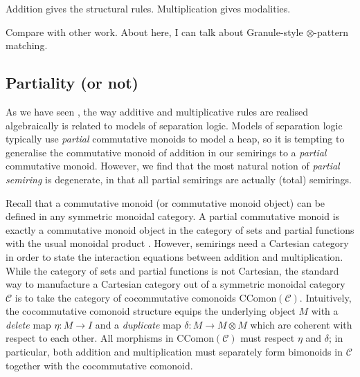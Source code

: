 Addition gives the structural rules.
Multiplication gives modalities.

Compare with other work.
About here, I can talk about Granule-style $\otimes$-pattern matching.

\subsection{Partiality (or not)} 

As we have seen , the way additive and multiplicative rules are
realised algebraically is related to models of separation logic.
Models of separation logic typically use \emph{partial} commutative monoids to
model a heap, so it is tempting to generalise the commutative monoid of
addition in our semirings to a \emph{partial} commutative monoid.
However, we find that the most natural notion of \emph{partial semiring} is
degenerate, in that all partial semirings are actually (total) semirings.

Recall that a commutative monoid (or commutative monoid object) can be
defined in any symmetric monoidal category.
A partial commutative monoid is exactly a commutative monoid object in the
category of sets and partial functions with the usual monoidal product
.
However, semirings need a Cartesian category in order to state the interaction
equations between addition and multiplication.
While the category of sets and partial functions is not Cartesian, the
standard way to manufacture a Cartesian category out of a symmetric monoidal
category $\mathcal C$ is to take the category of cocommutative comonoids
$\mathrm{CComon}(\mathcal C)$.
Intuitively, the cocommutative comonoid structure equips the underlying
object $M$ with a \emph{delete} map $\eta : M \to I$ and a \emph{duplicate}
map $\delta : M \to M \otimes M$ which are coherent with respect to each other.
All morphisms in $\mathrm{CComon}(\mathcal C)$ must respect $\eta$ and
$\delta$; in particular, both addition and multiplication must separately
form bimonoids in $\mathcal C$ together with the cocommutative comonoid.

